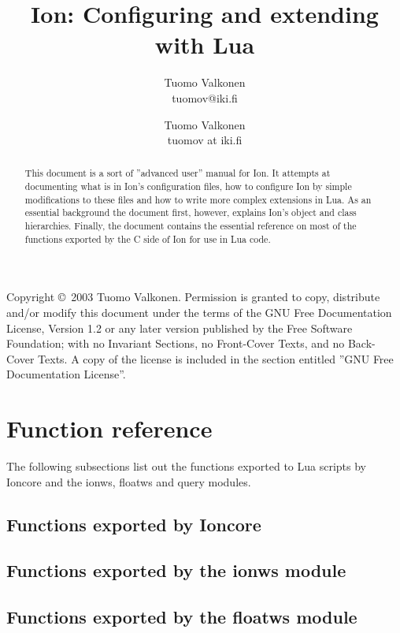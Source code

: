 \documentclass[english,a4paper,11pt,oldtoc,mctitle]{rapport3}
\title{Ion: Configuring and extending with Lua}
\author{Tuomo Valkonen \\ tuomov@iki.fi}
\author{Tuomo Valkonen \\ tuomov at iki.fi}
\begin{document}
\maketitle

Copyright \copyright\  2003 Tuomo Valkonen.
Permission is granted to copy, distribute and/or modify this document
under the terms of the GNU Free Documentation License, Version 1.2
or any later version published by the Free Software Foundation;
with no Invariant Sections, no Front-Cover Texts, and no Back-Cover Texts.
A copy of the license is included in the section entitled ''GNU
Free Documentation License''.

\begin{abstract}
    This document is a sort of ''advanced user'' manual for Ion. It
    attempts at documenting what is in Ion's configuration files,
    how to configure Ion by simple modifications to these files and
    how to write more complex extensions in Lua. As an essential 
    background the document first, however, explains Ion's object and
    class hierarchies. Finally, the document contains the essential
    reference on most of the functions exported by the C side of Ion
    for use in Lua code.
\end{abstract}

\tableofcontents





\chapter{Function reference}
\label{sec:exports}

The following subsections list out the functions exported to Lua scripts
by Ioncore and the ionws, floatws and query modules.

\section{Functions exported by Ioncore}
\label{sec:ioncoreref}



\section{Functions exported by the ionws module}
\label{sec:ionwsref}



\section{Functions exported by the floatws module}
\label{sec:floatwsref}
\end{document}
